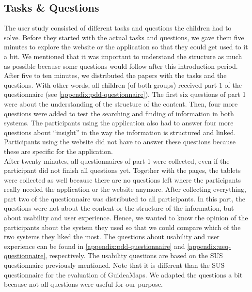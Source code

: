 \subsection{Tasks \& Questions}
The user study consisted of different tasks and questions the children had to solve. Before they started with the actual tasks and questions, we gave them five minutes to explore the website or the application so that they could get used to it a bit. We mentioned that it was important to understand the structure as much as possible because some questions would follow after this introduction period.\\

After five to ten minutes, we distributed the papers with the tasks and the questions. With other words, all children (of both groups) received part 1 of the questionnaire (see \autoref{appendix:pdd-questionnaire}). The first six questions of part 1 were about the understanding of the structure of the content. Then, four more questions were added to test the searching and finding of information in both systems. The participants using the application also had to answer four more questions about ``insight'' in the way the information is structured and linked. Participants using the website did not have to answer these questions because these are specific for the application.\\

After twenty minutes, all questionnaires of part 1 were collected, even if the participant did not finish all questions yet. Together with the pages, the tablets were collected as well because there are no questions left where the participants really needed the application or the website anymore. After collecting everything, part two of the questionnaire was distributed to all participants. In this part, the questions were not about the content or the structure of the information, but about usability and user experience. Hence, we wanted to know the opinion of the participants about the system they used so that we could compare which of the two systems they liked the most. The questions about usability and user experience can be found in \autoref{appendix:pdd-questionnaire} and \autoref{appendix:ueq-questionnaire}, respectively. The usability questions are based on the SUS questionnaire previously mentioned. Note that it is different than the SUS questionnaire for the evaluation of GuideaMaps. We adapted the questions a bit because not all questions were useful for our purpose.



